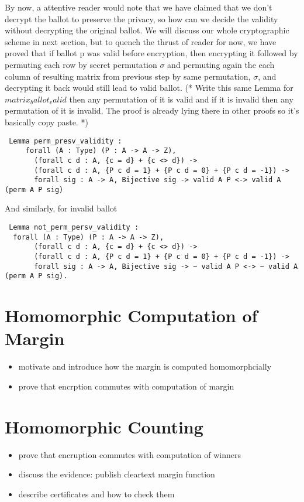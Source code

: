 \documentclass{llncs}
\begin{document}
 By now, a attentive reader would note that we have claimed that we don't decrypt
 the ballot to preserve the privacy, so how can we decide the validity 
 without decrypting the original ballot. We will discuss our whole cryptographic 
 scheme in next section, but to quench the thrust of reader for now, we have 
 proved that if ballot p was valid
 before encryption, then encrypting it followed by permuting each row by 
 secret permutation $\sigma$ and permuting again the each column of resulting matrix 
 from  previous step by same permutation, $\sigma$, and decrypting it back would
 still 
 lead to valid ballot. 
 (* Write this same Lemma for $matrix_ballot_valid$ then 
      any permutation of it is valid and if it is invalid then any permutation of 
       it is invalid. The proof is already lying there in other proofs so 
       it's basically copy paste.   *)
 \begin{verbatim}
 Lemma perm_presv_validity :
     forall (A : Type) (P : A -> A -> Z),
       (forall c d : A, {c = d} + {c <> d}) ->
       (forall c d : A, {P c d = 1} + {P c d = 0} + {P c d = -1}) ->
       forall sig : A -> A, Bijective sig -> valid A P <-> valid A (perm A P sig)
 \end{verbatim}
 And similarly, for invalid ballot 
 \begin{verbatim}
 Lemma not_perm_persv_validity :
  forall (A : Type) (P : A -> A -> Z),
       (forall c d : A, {c = d} + {c <> d}) ->
       (forall c d : A, {P c d = 1} + {P c d = 0} + {P c d = -1}) ->
       forall sig : A -> A, Bijective sig -> ~ valid A P <-> ~ valid A (perm A P sig).
\end{verbatim}

\section{Homomorphic Computation of Margin}
\begin{itemize}
  \item motivate and introduce how the margin is computed
  homomorphcially
  \item prove that encrption commutes with computation of margin
  
\end{itemize}

\section{Homomorphic Counting}
\begin{itemize}
  \item prove that encruption commutes with computation of winners
  \item discuss the evidence: publish cleartext margin function
  \item describe certificates and how to check them
\end{itemize}
\end{document}
